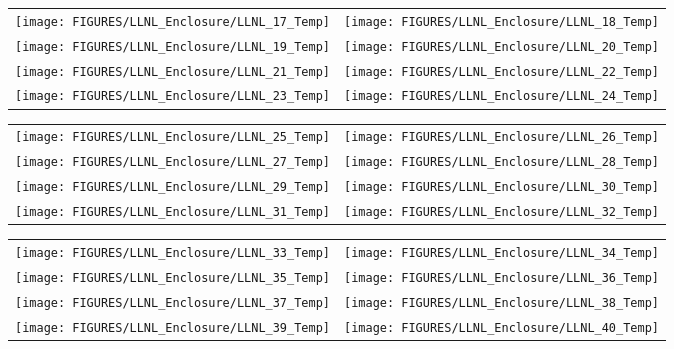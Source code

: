 \begin{figure}[p]
\begin{tabular*}{\textwidth}{l@{\extracolsep{\fill}}r}
\texttt{[image: FIGURES/LLNL\_Enclosure/LLNL\_17\_Temp]} &
\texttt{[image: FIGURES/LLNL\_Enclosure/LLNL\_18\_Temp]} \\
\texttt{[image: FIGURES/LLNL\_Enclosure/LLNL\_19\_Temp]} &
\texttt{[image: FIGURES/LLNL\_Enclosure/LLNL\_20\_Temp]} \\
\texttt{[image: FIGURES/LLNL\_Enclosure/LLNL\_21\_Temp]} &
\texttt{[image: FIGURES/LLNL\_Enclosure/LLNL\_22\_Temp]} \\
\texttt{[image: FIGURES/LLNL\_Enclosure/LLNL\_23\_Temp]} &
\texttt{[image: FIGURES/LLNL\_Enclosure/LLNL\_24\_Temp]}
\end{tabular*}
\label{LLNL_Enclosure_Temp_3}
\end{figure}

\begin{figure}[p]
\begin{tabular*}{\textwidth}{l@{\extracolsep{\fill}}r}
\texttt{[image: FIGURES/LLNL\_Enclosure/LLNL\_25\_Temp]} &
\texttt{[image: FIGURES/LLNL\_Enclosure/LLNL\_26\_Temp]} \\
\texttt{[image: FIGURES/LLNL\_Enclosure/LLNL\_27\_Temp]} &
\texttt{[image: FIGURES/LLNL\_Enclosure/LLNL\_28\_Temp]} \\
\texttt{[image: FIGURES/LLNL\_Enclosure/LLNL\_29\_Temp]} &
\texttt{[image: FIGURES/LLNL\_Enclosure/LLNL\_30\_Temp]} \\
\texttt{[image: FIGURES/LLNL\_Enclosure/LLNL\_31\_Temp]} &
\texttt{[image: FIGURES/LLNL\_Enclosure/LLNL\_32\_Temp]}
\end{tabular*}
\label{LLNL_Enclosure_Temp_4}
\end{figure}

\begin{figure}[p]
\begin{tabular*}{\textwidth}{l@{\extracolsep{\fill}}r}
\texttt{[image: FIGURES/LLNL\_Enclosure/LLNL\_33\_Temp]} &
\texttt{[image: FIGURES/LLNL\_Enclosure/LLNL\_34\_Temp]} \\
\texttt{[image: FIGURES/LLNL\_Enclosure/LLNL\_35\_Temp]} &
\texttt{[image: FIGURES/LLNL\_Enclosure/LLNL\_36\_Temp]} \\
\texttt{[image: FIGURES/LLNL\_Enclosure/LLNL\_37\_Temp]} &
\texttt{[image: FIGURES/LLNL\_Enclosure/LLNL\_38\_Temp]} \\
\texttt{[image: FIGURES/LLNL\_Enclosure/LLNL\_39\_Temp]} &
\texttt{[image: FIGURES/LLNL\_Enclosure/LLNL\_40\_Temp]}
\end{tabular*}
\label{LLNL_Enclosure_Temp_5}
\end{figure}

